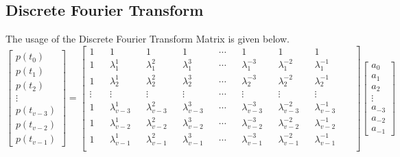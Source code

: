 \documentclass[a4paper, 12pt]{report}
\def\la{\lambda}
\begin{document}
\begin{center}
\subsection{Discrete Fourier Transform}
The usage of the Discrete Fourier Transform Matrix is given below.
$$\begin{bmatrix}p(t_0) \\ p(t_1) \\ p(t_2 )\\ \vdots \\ p(t_{v-3}) \\ p(t_{v-2}) \\ p(t_{v-1}) \end{bmatrix} = 
\begin{bmatrix}
 1 && 1 && 1 && 1 && \cdots && 1 && 1 && 1 \\
 1 && \la_{1}^{1} && \la_{1}^{2} && \la_{1}^{3} && \cdots && \la_{1}^{-3} && \la_{1}^{-2} && \la_{1}^{-1} && \\
 1 && \la_{2}^{1} && \la_{2}^{2} && \la_{2}^{3} && \cdots && \la_{2}^{-3} && \la_{2}^{-2} && \la_{2}^{-1} && \\
 \vdots && \vdots && \vdots && \vdots && \cdots && \vdots && \vdots && \vdots && \\
 1 && \la_{v-3}^{1} && \la_{v-3}^{2} && \la_{v-3}^{3} && \cdots && \la_{v-3}^{-3} && \la_{v-3}^{-2} && \la_{v-3}^{-1} && \\
 1 && \la_{v-2}^{1} && \la_{v-2}^{2} && \la_{v-2}^{3} && \cdots && \la_{v-2}^{-3} && \la_{v-2}^{-2} && \la_{v-2}^{-1} && \\
 1 && \la_{v-1}^{1} && \la_{v-1}^{2} && \la_{v-1}^{3} && \cdots && \la_{v-1}^{-3} && \la_{v-1}^{-2} && \la_{v-1}^{-1} && \\
\end{bmatrix}
\begin{bmatrix} a_{0} \\ a_{1} \\ a_{2} \\ \vdots \\ a_{-3} \\ a_{-2} \\ a_{-1} \end{bmatrix} $$

\end{center}
\end{document}
